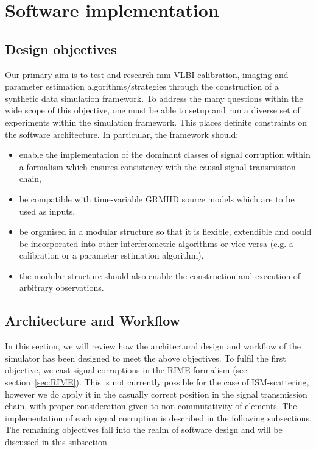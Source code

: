 \chapter{Software implementation}\label{chap:imp}

\section{Design objectives}\label{sec:des_obj}
Our primary aim is to test and research mm-VLBI calibration, imaging and parameter estimation algorithms/strategies through the construction of a synthetic data simulation framework. To address the many questions within the wide scope of this objective, one must be able to setup and run a diverse set of experiments within the simulation framework. This places definite constraints on the software architecture. In particular, the framework should:


\begin{itemize}
 \item enable the implementation of the dominant classes of signal corruption within a formalism which ensures consistency with the causal signal transmission chain,
 \item be compatible with time-variable GRMHD source models which are to be used as inputs,
 \item be organised in a modular structure so that it is flexible, extendible and could be incorporated into other interferometric algorithms or vice-versa (e.g. a calibration or a parameter estimation algorithm),
 \item the modular structure should also enable the construction and execution of arbitrary observations.
\end{itemize}

\section{Architecture and Workflow}\label{sec:arch}
In this section, we will review how the architectural design and workflow of the simulator has been designed to meet the above objectives. To fulfil the first objective, we cast signal corruptions in the RIME formalism (see section~\ref{sec:RIME}). This is not currently possible for the case of ISM-scattering, however we do apply it in the casually correct position in the signal transmission chain, with proper consideration given to non-commutativity of elements. The implementation of each signal corruption is described in the following subsections. The remaining objectives fall into the realm of software design and will be discussed in this subsection. 


